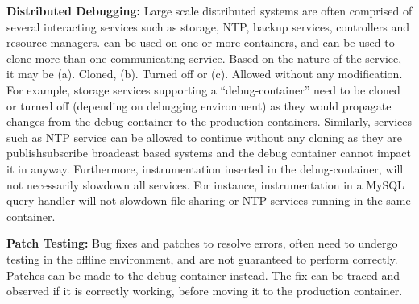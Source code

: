 \noindent
\textbf{Distributed Debugging:}  
Large scale distributed systems are often comprised of several interacting services such as storage, NTP, backup services, controllers and resource managers.
\parikshan can be used on one or more containers, and can be used to clone more than one communicating service.
Based on the nature of the service, it may be (a). Cloned, (b). Turned off or (c). Allowed without any modification.
For example, storage services supporting a ``debug-container'' need to be cloned or turned off (depending on debugging environment) as they would propagate changes from the debug container to the production containers.
Similarly, services such as NTP service can be allowed to continue without any cloning as they are publish\/subscribe broadcast based systems and the debug container cannot impact it in anyway.
Furthermore, instrumentation inserted in the debug-container, will not necessarily slowdown all services.
For instance, instrumentation in a MySQL query handler will not slowdown file-sharing or NTP services running in the same container.

\noindent
\textbf{Patch Testing:}
Bug fixes and patches to resolve errors, often need to undergo testing in the offline environment, and are not guaranteed to perform correctly.
Patches can be made to the debug-container instead. 
The fix can be traced and observed if it is correctly working, before moving it to the production container.